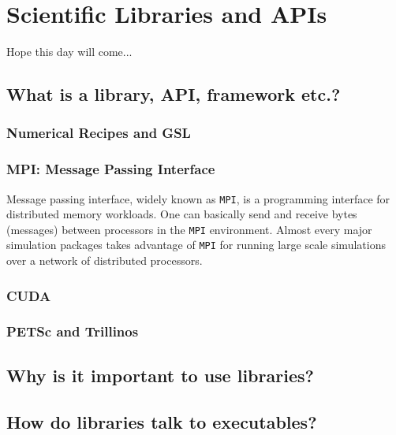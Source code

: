 \chapter{Scientific Libraries and APIs} \label{chap-scientific}
Hope this day will come...

\section{What is a library, API, framework etc.?}
\subsection{Numerical Recipes and GSL}
\subsection{MPI: Message Passing Interface}
Message passing interface, widely known as \texttt{MPI}, is a programming interface for distributed 
memory workloads. One can basically send and receive bytes (messages) between processors in the 
\texttt{MPI} environment. Almost every major simulation packages takes advantage of \texttt{MPI}
for running large scale simulations over a network of distributed processors.

\subsection{CUDA}

\subsection{PETSc and Trillinos}

\section{Why is it important to use libraries?}

\section{How do libraries talk to executables?}
